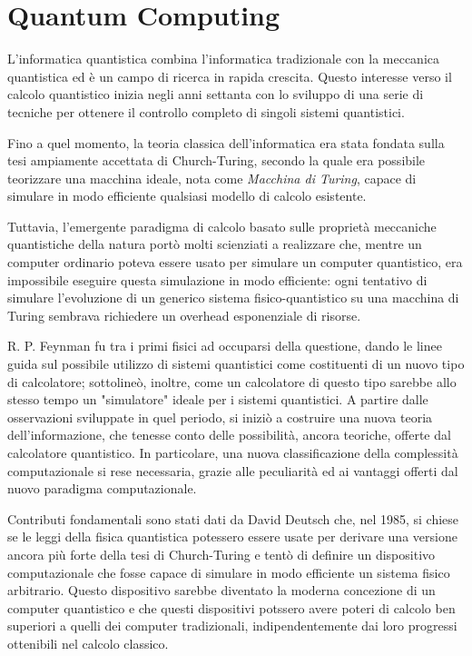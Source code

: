 \chapter{Quantum Computing}
L'informatica quantistica combina l'informatica tradizionale con la meccanica quantistica ed è un campo di ricerca in rapida crescita. Questo interesse verso il calcolo quantistico inizia negli anni settanta con lo sviluppo di una serie di tecniche per ottenere il controllo completo di singoli sistemi quantistici. 

Fino a quel momento, la teoria classica dell'informatica era stata fondata sulla tesi ampiamente accettata di Church-Turing, secondo la quale era possibile teorizzare una macchina ideale, nota come \textit{Macchina di Turing}, capace di simulare in modo efficiente qualsiasi modello di calcolo esistente.

Tuttavia, l'emergente paradigma di calcolo basato sulle proprietà meccaniche quantistiche della natura portò molti scienziati a realizzare che, mentre un computer ordinario poteva essere usato per simulare un computer quantistico, era impossibile eseguire questa simulazione in modo efficiente: ogni tentativo di simulare l'evoluzione di un generico sistema fisico-quantistico su una macchina di Turing sembrava richiedere un overhead esponenziale di risorse.

R. P. Feynman fu tra i primi fisici ad occuparsi della questione, dando le linee guida sul possibile utilizzo di sistemi quantistici come costituenti di un nuovo tipo di calcolatore; sottolineò, inoltre, come un calcolatore di questo tipo sarebbe allo stesso tempo un "simulatore" ideale per i sistemi quantistici. A partire dalle osservazioni sviluppate in quel periodo, si iniziò a costruire una nuova teoria dell'informazione, che tenesse conto delle possibilità, ancora teoriche, offerte dal calcolatore quantistico. In particolare, una nuova classificazione della complessità computazionale si rese necessaria, grazie alle peculiarità ed ai vantaggi offerti dal nuovo paradigma computazionale.

Contributi fondamentali sono stati dati da David Deutsch che, nel 1985, si chiese se le leggi della fisica quantistica potessero essere usate per derivare una versione ancora più forte della tesi di Church-Turing e tentò di definire un dispositivo computazionale che fosse capace di simulare in modo efficiente un sistema fisico arbitrario. Questo dispositivo sarebbe diventato la moderna concezione di un computer quantistico e che questi dispositivi potssero avere poteri di calcolo ben superiori a quelli dei computer tradizionali, indipendentemente dai loro progressi ottenibili nel calcolo classico.

